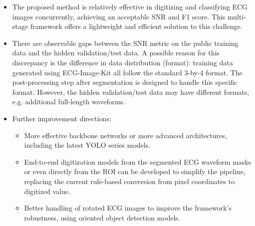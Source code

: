 \documentclass[a0paper,portrait]{baposter}
\begin{document}
\begin{poster}
{\begin{itemize}
\item The proposed method is relatively effective in digitizing and classifying ECG images concurrently, achieving an acceptable SNR and F1 score. This multi-stage framework offers a lightweight and efficient solution to this challenge.
\vspace{-0.2cm}
\item There are observable gaps between the SNR metric on the public training data and the hidden validation/test data. A possible reason for this discrepancy is the difference in data distribution (format): training data generated using ECG-Image-Kit all follow the standard 3-by-4 format. The post-processing step after segmentation is designed to handle this specific format. However, the hidden validation/test data may have different formats, e.g. additional full-length waveforms.
\vspace{-0.2cm}
\item Further improvement directions:
\vspace{-0.2cm}
\begin{itemize}
    \item More effective backbone networks or more advanced architectures, including the latest YOLO series models.
    \vspace{-0.1cm}
    \item End-to-end digitization models from the segmented ECG waveform masks or even directly from the ROI can be developed to simplify the pipeline, replacing the current rule-based conversion from pixel coordinates to digitized value.
    \vspace{-0.1cm}
    \item Better handling of rotated ECG images to improve the framework's robustness, using oriented object detection models.
\end{itemize}
\end{itemize}

}







\end{poster}
\end{document}
